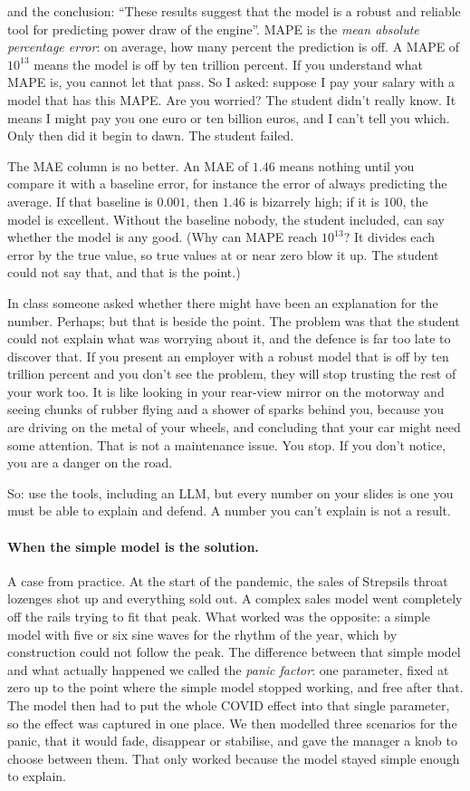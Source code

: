 \documentclass[12pt, a4paper]{article}
\theoremstyle{definition}
\theoremstyle{remark}
\begin{document}
and the conclusion: ``These results suggest that the model is a robust and reliable tool for predicting power draw of the engine''. MAPE is the \emph{mean absolute percentage error}: on average, how many percent the prediction is off. A MAPE of $10^{13}$ means the model is off by ten trillion percent. If you understand what MAPE is, you cannot let that pass. So I asked: suppose I pay your salary with a model that has this MAPE. Are you worried? The student didn't really know. It means I might pay you one euro or ten billion euros, and I can't tell you which. Only then did it begin to dawn. The student failed.

The MAE column is no better. An MAE of $1.46$ means nothing until you compare it with a baseline error, for instance the error of always predicting the average. If that baseline is $0.001$, then $1.46$ is bizarrely high; if it is $100$, the model is excellent. Without the baseline nobody, the student included, can say whether the model is any good. (Why can MAPE reach $10^{13}$? It divides each error by the true value, so true values at or near zero blow it up. The student could not say that, and that is the point.)

In class someone asked whether there might have been an explanation for the number. Perhaps; but that is beside the point. The problem was that the student could not explain what was worrying about it, and the defence is far too late to discover that. If you present an employer with a robust model that is off by ten trillion percent and you don't see the problem, they will stop trusting the rest of your work too. It is like looking in your rear-view mirror on the motorway and seeing chunks of rubber flying and a shower of sparks behind you, because you are driving on the metal of your wheels, and concluding that your car might need some attention. That is not a maintenance issue. You stop. If you don't notice, you are a danger on the road.

So: use the tools, including an LLM, but every number on your slides is one you must be able to explain and defend. A number you can't explain is not a result.

\paragraph{When the simple model is the solution.}
A case from practice. At the start of the pandemic, the sales of Strepsils throat lozenges shot up and everything sold out. A complex sales model went completely off the rails trying to fit that peak. What worked was the opposite: a simple model with five or six sine waves for the rhythm of the year, which by construction could not follow the peak. The difference between that simple model and what actually happened we called the \emph{panic factor}: one parameter, fixed at zero up to the point where the simple model stopped working, and free after that. The model then had to put the whole COVID effect into that single parameter, so the effect was captured in one place. We then modelled three scenarios for the panic, that it would fade, disappear or stabilise, and gave the manager a knob to choose between them. That only worked because the model stayed simple enough to explain.
\end{document}
